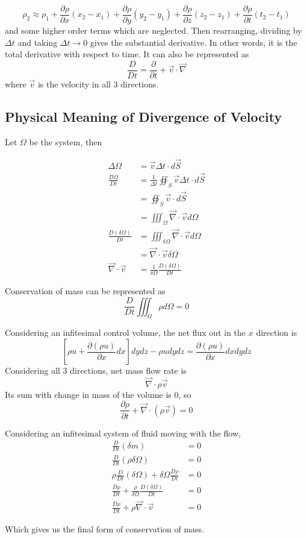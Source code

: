 \documentclass[12pt]{article}
\begin{document}
$$\rho_2 \approx \rho_1 + \frac{\partial\rho}{\partial x}(x_2-x_1) + \frac{\partial\rho}{\partial y}(y_2-y_1) + \frac{\partial\rho}{\partial z}(z_2-z_1) + \frac{\partial\rho}{\partial t}(t_2-t_1)$$
and some higher order terms which are neglected. Then rearranging, dividing by $\Delta t$ and taking $\Delta t \rightarrow 0$ gives the substantial derivative. In other words, it is the total derivative with respect to time. It can also be represented as
$$\frac{D}{Dt} = \frac{\partial}{\partial t} + \vec{v}\cdot\vec{\nabla}$$
where $\vec{v}$ is the velocity in all 3 directions.

\subsection{Physical Meaning of Divergence of Velocity}

Let $\Omega$ be the system, then

\begin{align*}
	\Delta\Omega &= \vec{v}\Delta t\cdot d\vec{S} \\
	\frac{D\Omega}{Dt} &= \frac{1}{\Delta t}\oiint_S \vec{v}\Delta t\cdot d\vec{S} \\
			   &= \oiint_S \vec{v}\cdot d\vec{S} \\
			   &= \iiint_\Omega \vec{\nabla}\cdot\vec{v}d\Omega \\
	\frac{D(\delta\Omega)}{Dt} &= \iiint_{\delta\Omega} \vec{\nabla}\cdot\vec{v}d\Omega \\
				   &= \vec{\nabla}\cdot\vec{v}\delta\Omega \\
	\vec{\nabla}\cdot\vec{v} &= \frac{1}{\delta\Omega} \frac{D(\delta\Omega)}{Dt}
\end{align*}

\begin{ex}
	Conservation of mass can be represented as
	$$\frac{D}{Dt} \iiint_\Omega \rho d\Omega = 0$$
\end{ex}

Considering an infitesimal control volume, the net flux out in the $x$ direction is
$$\left[\rho u + \frac{\partial(\rho u)}{\partial x}dx\right]dydz - \rho udydz = \frac{\partial(\rho u)}{\partial x}dxdydz$$
Considering all 3 directions, net mass flow rate is
$$\vec{\nabla}\cdot\rho\vec{v}$$
Its sum with change in mass of the volume is 0, so
$$\frac{\partial\rho}{\partial t} + \vec{\nabla}\cdot(\rho\vec{v}) = 0$$

Considering an infitesimal system of fluid moving with the flow,
\begin{align*}
	\frac{D}{Dt}(\delta m) &= 0 \\
	\frac{D}{Dt}(\rho\delta\Omega) &= 0 \\
	\rho\frac{D}{Dt}(\delta\Omega) + \delta\Omega\frac{D\rho}{Dt} &= 0 \\
	\frac{D\rho}{Dt} + \frac{\rho}{\delta\Omega}\frac{D(\delta\Omega)}{Dt} &= 0 \\
	\frac{D\rho}{Dt} + \rho\vec{\nabla}\cdot\vec{v} &= 0
\end{align*}

Which gives us the final form of conservation of mass.
\end{document}
